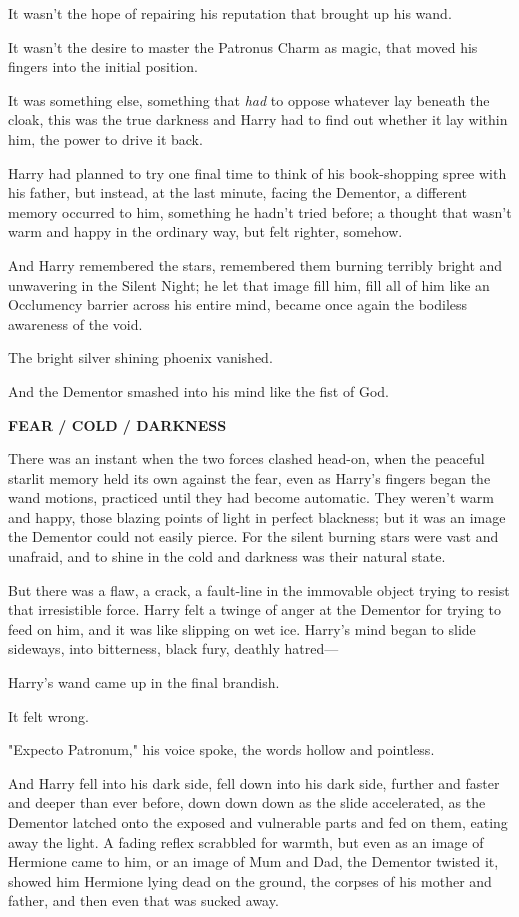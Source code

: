 It wasn't the hope of repairing his reputation that brought up his wand.

It wasn't the desire to master the Patronus Charm as magic, that moved his
fingers into the initial position.

It was something else, something that \emph{had} to oppose whatever lay beneath
the cloak, this was the true darkness and Harry had to find out whether it lay
within him, the power to drive it back.

Harry had planned to try one final time to think of his book-shopping spree
with his father, but instead, at the last minute, facing the Dementor, a
different memory occurred to him, something he hadn't tried before; a thought
that wasn't warm and happy in the ordinary way, but felt righter, somehow.

And Harry remembered the stars, remembered them burning terribly bright and
unwavering in the Silent Night; he let that image fill him, fill all of him
like an Occlumency barrier across his entire mind, became once again the
bodiless awareness of the void.

The bright silver shining phoenix vanished.

And the Dementor smashed into his mind like the fist of God.

\textbf{FEAR / COLD / DARKNESS}

There was an instant when the two forces clashed head-on, when the peaceful
starlit memory held its own against the fear, even as Harry's fingers began the
wand motions, practiced until they had become automatic. They weren't warm and
happy, those blazing points of light in perfect blackness; but it was an image
the Dementor could not easily pierce. For the silent burning stars were vast
and unafraid, and to shine in the cold and darkness was their natural state.

But there was a flaw, a crack, a fault-line in the immovable object trying to
resist that irresistible force. Harry felt a twinge of anger at the Dementor
for trying to feed on him, and it was like slipping on wet ice. Harry's mind
began to slide sideways, into bitterness, black fury, deathly hatred—

Harry's wand came up in the final brandish.

It felt wrong.

"Expecto Patronum," his voice spoke, the words hollow and pointless.

And Harry fell into his dark side, fell down into his dark side, further and
faster and deeper than ever before, down down down as the slide accelerated, as
the Dementor latched onto the exposed and vulnerable parts and fed on them,
eating away the light. A fading reflex scrabbled for warmth, but even as an
image of Hermione came to him, or an image of Mum and Dad, the Dementor twisted
it, showed him Hermione lying dead on the ground, the corpses of his mother and
father, and then even that was sucked away.

